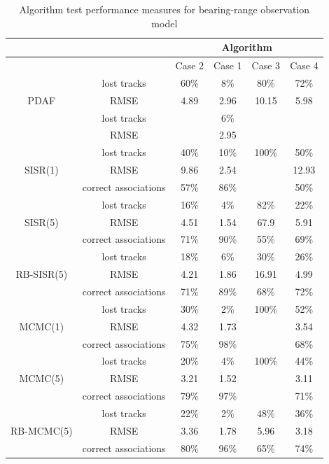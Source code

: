 \begin{table}[!p] \centering
\begin{tabular}{|c|c|c|c|c|c|}
\hline
 & & \multicolumn{4}{|c|}{Algorithm} \\
\hline
 & & Case 2 & Case 1 & Case 3 & Case 4 \\
\hline
\multirow{3}{*}{PDAF} & lost tracks             & 60\% & 8\% & 80\% & 72\% \\
                         & RMSE                 & 4.89 & 2.96 & 10.15 & 5.98 \\
\hline
\multirow{3}{*}{JPDAF} & lost tracks            &  & 6\% &  &  \\
                         & RMSE                 &  & 2.95 &  &  \\
\hline
\multirow{3}{*}{SISR(1)} & lost tracks          & 40\% & 10\% & 100\% & 50\% \\
                         & RMSE                 & 9.86 & 2.54 &  & 12.93 \\
                         & correct associations & 57\% & 86\% &  & 50\% \\
\hline
\multirow{3}{*}{SISR(5)} & lost tracks          & 16\% & 4\% & 82\% & 22\% \\
                         & RMSE                 & 4.51 & 1.54 & 67.9 & 5.91 \\
                         & correct associations & 71\% & 90\% & 55\% & 69\% \\
\hline
\multirow{3}{*}{RB-SISR(5)} & lost tracks       & 18\% & 6\% & 30\% & 26\% \\
                         & RMSE                 & 4.21 & 1.86 & 16.91 & 4.99 \\
                         & correct associations & 71\% & 89\% & 68\% & 72\% \\
\hline
\multirow{3}{*}{MCMC(1)} & lost tracks          & 30\% & 2\% & 100\% & 52\% \\
                         & RMSE                 & 4.32 & 1.73 &  & 3.54 \\
                         & correct associations & 75\% & 98\% &  & 68\% \\
\hline
\multirow{3}{*}{MCMC(5)} & lost tracks          & 20\% & 4\% & 100\% & 44\% \\
                         & RMSE                 & 3.21 & 1.52 &  & 3.11 \\
                         & correct associations & 79\% & 97\% &  & 71\% \\
\hline
\multirow{3}{*}{RB-MCMC(5)} & lost tracks       & 22\% & 2\% & 48\% & 36\% \\
                         & RMSE                 & 3.36 & 1.78 & 5.96 & 3.18 \\
                         & correct associations & 80\% & 96\% & 65\% & 74\% \\
\hline
\end{tabular}
\caption{Algorithm test performance measures for bearing-range observation model}
\label{tab:ResultsRadar}
\end{table}

